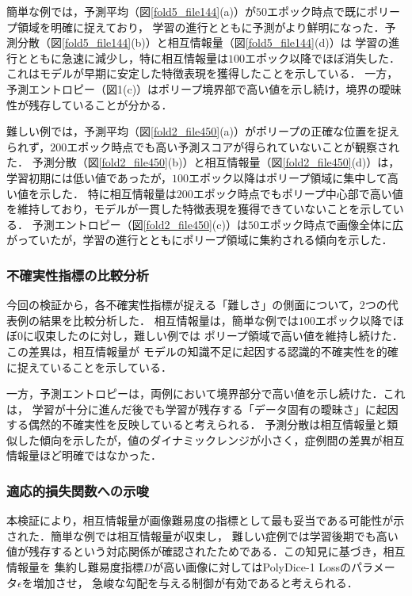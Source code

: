 \documentclass[10pt, a4paper, twocolumn]{jarticle}
\begin{document}
簡単な例では，予測平均（図\ref{fold5_file144}(a)）が$50$エポック時点で既にポリープ領域を明確に捉えており，
学習の進行とともに予測がより鮮明になった．予測分散（図\ref{fold5_file144}(b)）と相互情報量（図\ref{fold5_file144}(d)）は
学習の進行とともに急速に減少し，特に相互情報量は$100$エポック以降でほぼ消失した．これはモデルが早期に安定した特徴表現を獲得したことを示している．
一方，予測エントロピー（図1(c)）はポリープ境界部で高い値を示し続け，境界の曖昧性が残存していることが分かる．

難しい例では，予測平均（図\ref{fold2_file450}(a)）がポリープの正確な位置を捉えられず，$200$エポック時点でも高い予測スコアが得られていないことが観察された．
予測分散（図\ref{fold2_file450}(b)）と相互情報量（図\ref{fold2_file450}(d)）は，学習初期には低い値であったが，$100$エポック以降はポリープ領域に集中して高い値を示した．
特に相互情報量は$200$エポック時点でもポリープ中心部で高い値を維持しており，モデルが一貫した特徴表現を獲得できていないことを示している．
予測エントロピー（図\ref{fold2_file450}(c)）は$50$エポック時点で画像全体に広がっていたが，学習の進行とともにポリープ領域に集約される傾向を示した．

\subsubsection{不確実性指標の比較分析}

今回の検証から，各不確実性指標が捉える「難しさ」の側面について，2つの代表例の結果を比較分析した．
相互情報量は，簡単な例では$100$エポック以降でほぼ$0$に収束したのに対し，難しい例では
ポリープ領域で高い値を維持し続けた．この差異は，相互情報量が
モデルの知識不足に起因する認識的不確実性を的確に捉えていることを示している．

一方，予測エントロピーは，両例において境界部分で高い値を示し続けた．これは，
学習が十分に進んだ後でも学習が残存する「データ固有の曖昧さ」に起因する偶然的不確実性を反映していると考えられる．
予測分散は相互情報量と類似した傾向を示したが，値のダイナミックレンジが小さく，症例間の差異が相互情報量ほど明確ではなかった．

\subsubsection{適応的損失関数への示唆}
本検証により，相互情報量が画像難易度の指標として最も妥当である可能性が示された．簡単な例では相互情報量が収束し，
難しい症例では学習後期でも高い値が残存するという対応関係が確認されたためである．この知見に基づき，相互情報量を
集約し難易度指標$D$が高い画像に対してはPolyDice-1 Lossのパラメータ$\epsilon$を増加させ，
急峻な勾配を与える制御が有効であると考えられる．
\end{document}
